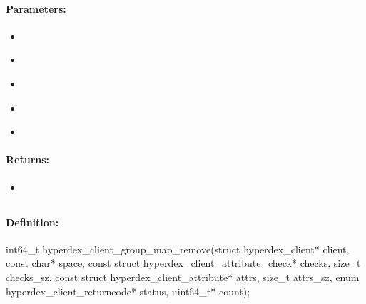 \paragraph{Parameters:}
\begin{itemize}[noitemsep]
\item {}\\

\item {}\\

\item {}\\

\item {}\\

\item {}\\

\end{itemize}

\paragraph{Returns:}
\begin{itemize}[noitemsep]
\item {}\\

\end{itemize}

\pagebreak
\subsection{}
\label{api:c:group_map_remove}


\paragraph{Definition:}
\begin{ccode}
int64_t hyperdex_client_group_map_remove(struct hyperdex_client* client,
        const char* space,
        const struct hyperdex_client_attribute_check* checks, size_t checks_sz,
        const struct hyperdex_client_attribute* attrs, size_t attrs_sz,
        enum hyperdex_client_returncode* status,
        uint64_t* count);
\end{ccode}

